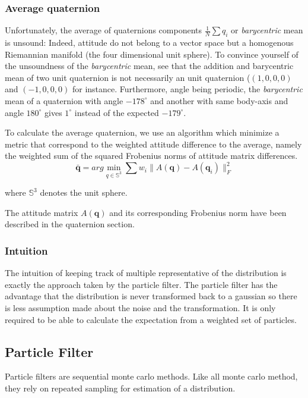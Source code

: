 \documentclass[12pt,]{article}
\begin{document}
\subsubsection{Average quaternion}\label{average-quaternion}

Unfortunately, the average of quaternions components
\(\frac{1}{N} \sum q_i\) or \emph{barycentric} mean is unsound: Indeed,
attitude do not belong to a vector space but a homogenous Riemannian
manifold (the four dimensional unit sphere). To convince yourself of the
unsoundness of the \emph{barycentric} mean, see that the addition and
barycentric mean of two unit quaternion is not necessarily an unit
quaternion (\((1, 0, 0, 0)\) and \((-1, 0, 0, 0)\) for instance.
Furthermore, angle being periodic, the \emph{barycentric} mean of a
quaternion with angle \(-178^\circ\) and another with same body-axis and
angle \(180^\circ\) gives \(1^\circ\) instead of the expected
\(-179^\circ\).

To calculate the average quaternion, we use an algorithm which minimize
a metric that correspond to the weighted attitude difference to the
average, namely the weighted sum of the squared Frobenius norms of
attitude matrix differences.
\[\bar{\mathbf{q}} = arg \min_{q \in \mathbb{S}^3} \sum w_i \| A(\mathbf{q}) - A(\mathbf{q}_i) \|^2_F\]

where \(\mathbb{S}^3\) denotes the unit sphere.

The attitude matrix \(A(\mathbf{q})\) and its corresponding Frobenius
norm have been described in the quaternion section.

\subsubsection{Intuition}\label{intuition}

The intuition of keeping track of multiple representative of the
distribution is exactly the approach taken by the particle filter. The
particle filter has the advantage that the distribution is never
transformed back to a gaussian so there is less assumption made about
the noise and the transformation. It is only required to be able to
calculate the expectation from a weighted set of particles.

\subsection{Particle Filter}\label{particle-filter}

Particle filters are sequential monte carlo methods. Like all monte
carlo method, they rely on repeated sampling for estimation of a
distribution.
\end{document}
